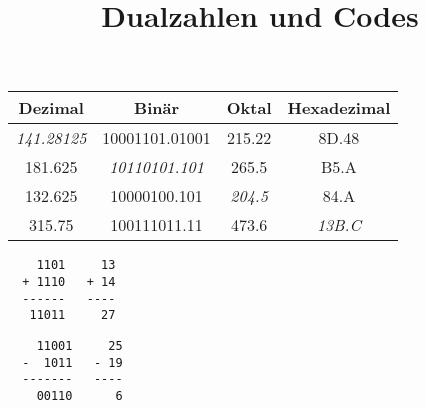 \documentclass{CInf_practice}
\title{Dualzahlen und Codes}
\begin{document}
\cinftitle




\begin{center}
	\begin{tabular}{|c|c|c|c|}
  \hline \bf Dezimal   & \bf Binär          & \bf Oktal  & \bf Hexadezimal \\
  \hline \sl 141.28125 &     10001101.01001 &     215.22 &      8D.48      \\
  \hline     181.625   & \sl 10110101.101   &     265.5  &      B5.A       \\
  \hline     132.625   &     10000100.101   & \sl 204.5  &      84.A       \\
  \hline     315.75    &    100111011.11    &     473.6  & \sl 13B.C       \\
  \hline
  \end{tabular}
\end{center}




\subex

\begin{lstlisting}
    1101     13
  + 1110   + 14
  ------   ----
   11011     27
\end{lstlisting}


\subex

\begin{lstlisting}
    11001     25
  -  1011   - 19
  -------   ----
    00110      6
\end{lstlisting}
\end{document}

